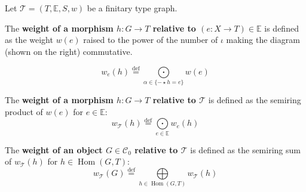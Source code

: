 \begin{definition}
    \label{def:weight}
    Let $\mathcal{T} = (T,\mathbb{E},S, w)$ be a finitary type graph.
    \newline
    \noindent
    \begin{minipage}{0.6\textwidth}
        The \textbf{weight of a morphism $h: G \rightarrow T$ relative to $(e:X \to T) \in \mathbb{E}$} is defined as the weight $w(e)$ raised to the power of the number of $\iota$ making the diagram (shown on the right) commutative.
    \end{minipage}
    \begin{minipage}{0.29\textwidth}
        \begin{center}
        \end{center} 
    \end{minipage}
                \[
                w_e(h) 
                    \overset{\operatorname{def}}{=}
                \underset{\alpha \in \{- \star h = e\}}{\bigodot}w(e) 
                \]

        \noindent
        The \textbf{weight of a morphism $h: G \rightarrow T$ relative to \(\mathcal{T}\)} is defined as the semiring product of $w(e)$ for $e \in \mathbb{E}$:
        \[  w_\mathcal{T}(h) \overset{\operatorname{def}}{=} \underset{e \in \mathbb{E}}{\bigodot} 
                w_e(h) \]

        \noindent
       The \textbf{weight of an object \( G \in \mathcal{C}_0 \) relative to \( \mathcal{T}\)} is defined as the semiring sum of $w_\mathcal{T}(h)$ for $h \in \operatorname{Hom}(G,T)$:
        \[w_\mathcal{T}(G) \overset{\operatorname{def}}{=} \underset{h \in \operatorname{Hom}(G,T)}{\bigoplus}  w_\mathcal{T}(h) \]
\end{definition}





